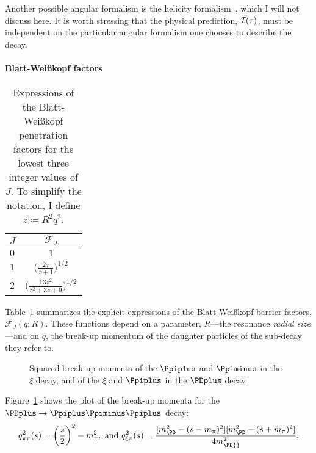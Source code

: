     Another possible angular formalism is the helicity formalism~\cite{jacob1959404}, which I will not discuss here.
    It is worth stressing that the physical prediction, $\mathcal{I}(\tau)$, must be independent on the particular angular formalism one chooses to describe the decay.


    \paragraph{Blatt-Wei\ss{}kopf factors}

    \begin{table}
        \centering
        \caption{Expressions of the Blatt-Wei\ss{}kopf penetration factors for the lowest three integer values of $J$. To simplify the notation, I define $z\coloneqq R^2 q^2$.}
        \label{table:blatt_weisskopf}
        \begin{tabular}{lc}
            \toprule
            $J$ &$\mathcal{F}_{\!J}$\\
            \midrule
            $0$ &$1$ \\
            $1$ &$\bigg(\displaystyle\frac{2z}{z + 1}\bigg)^{1/2}$ \\
            $2$ &$\bigg(\displaystyle\frac{13 z^2 }{z^2 + 3z + 9}\bigg)^{1/2}$ \\
            \bottomrule
        \end{tabular}
    \end{table}
    Table~\ref{table:blatt_weisskopf} summarizes the explicit expressions of the Blatt-Wei\ss{}kopf barrier factors, $\mathcal{F}_{\!J}(q; R)$.
    These functions depend on a parameter, $R$---the resonance \emph{radial size}---and on $q$, the break-up momentum of the daughter particles of the sub-decay they refer to.
    \begin{figure}
        \centering
        
        \caption{Squared break-up momenta of the $\Ppiplus$ and $\Ppiminus$ in the $\xi$ decay, and of the $\xi$ and $\Ppiplus$ in the $\PDplus$ decay.}
        \label{fig:break_up_momenta}
    \end{figure}
    Figure~\ref{fig:break_up_momenta} shows the plot of the break-up momenta for the $\PDplus\to\Ppiplus\Ppiminus\Ppiplus$ decay:
    \begin{equation}
        q_{\pi\pi}^2(s) = \bigg(\frac{s}{2}\bigg)^2 - m_{\pi}^2,
        \text{ and }
        q_{\xi\pi}^2(s) = \frac{[m_{\PD}^2 - (s - m_\pi)^2][m_{\PD}^2 - (s+m_\pi)^2]}{4m_{\PD{}}^2},
    \end{equation}
